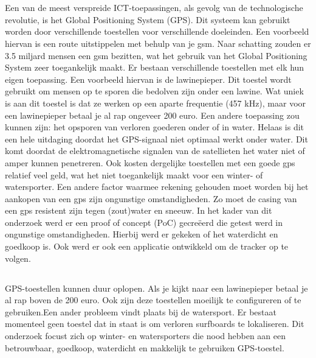 
\chapter{}
\label{ch:inleiding}
Een van de meest verspreide ICT-toepassingen, als gevolg van de technologische revolutie, is het Global Positioning System (GPS). Dit systeem kan gebruikt worden door verschillende toestellen voor verschillende doeleinden. Een voorbeeld hiervan is een route uitstippelen met behulp van je gsm. Naar schatting zouden er 3.5 miljard mensen een gsm bezitten, wat het gebruik van het Global Positioning System zeer toegankelijk maakt. \autocite{numberOfSmartphones} Er bestaan verschillende toestellen met elk hun eigen toepassing. Een voorbeeld hiervan is de lawinepieper. Dit toestel wordt gebruikt om mensen op te sporen die bedolven zijn onder een lawine. Wat uniek is aan dit toestel is dat ze werken op een aparte frequentie (457 kHz), maar voor een lawinepieper betaal je al rap ongeveer 200 euro. \cite{avalancheTransceivers}
Een andere toepassing zou kunnen zijn: het opsporen van verloren goederen onder of in water. Helaas is dit een hele uitdaging doordat
het GPS-signaal niet optimaal werkt onder water. \cite{underwaterProblem} Dit komt doordat de elektromagnetische signalen van de satellieten het water niet of amper kunnen penetreren. Ook kosten dergelijke toestellen met een goede gps relatief veel geld, wat het niet toegankelijk maakt voor een winter- of watersporter. 
Een andere factor waarmee rekening gehouden moet worden bij het aankopen van een gps zijn ongunstige omstandigheden. Zo moet de casing van een gps resistent zijn tegen (zout)water en sneeuw.
In het kader van dit onderzoek werd er een proof of concept (PoC) gecreëerd die getest werd in ongunstige omstandigheden. Hierbij werd er gekeken of het waterdicht en goedkoop is. Ook werd er ook een applicatie ontwikkeld om de tracker op te volgen.


\section{}
\label{sec:probleemstelling}

GPS-toestellen kunnen duur oplopen. Als je kijkt naar een lawinepieper betaal je al rap boven de 200 euro. Ook zijn deze toestellen moeilijk te configureren of te gebruiken.Een ander probleem vindt plaats bij de watersport. Er bestaat momenteel geen toestel dat in staat is om verloren surfboards te lokaliseren. Dit onderzoek focust zich op winter- en watersporters die nood hebben aan een betrouwbaar, goedkoop, waterdicht en makkelijk te gebruiken GPS-toestel.

